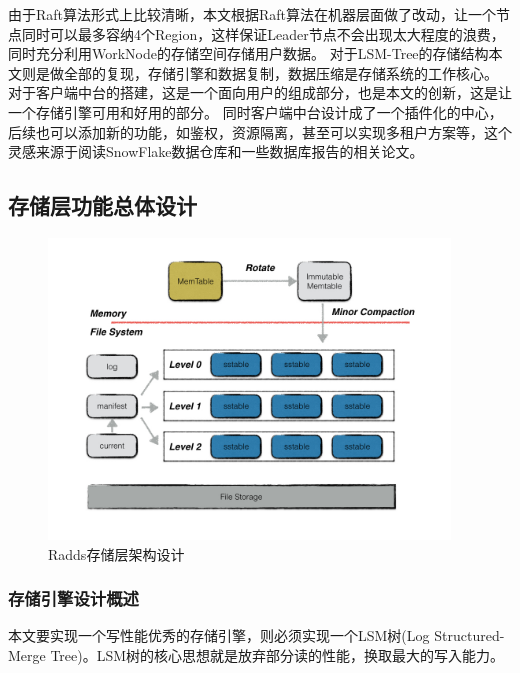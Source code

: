 \begin{enumerate}[fullwidth,itemindent=2em,listparindent=2em]
			由于Raft算法形式上比较清晰，本文根据Raft算法在机器层面做了改动，让一个节点同时可以最多容纳4个Region，这样保证Leader节点不会出现太大程度的浪费，
			同时充分利用WorkNode的存储空间存储用户数据。
			对于LSM-Tree的存储结构本文则是做全部的复现，存储引擎和数据复制，数据压缩是存储系统的工作核心。
			对于客户端中台的搭建，这是一个面向用户的组成部分，也是本文的创新，这是让一个存储引擎可用和好用的部分。
			同时客户端中台设计成了一个插件化的中心，后续也可以添加新的功能，如鉴权，资源隔离，甚至可以实现多租户方案等，这个灵感来源于阅读SnowFlake数据仓库和一些数据库报告的相关论文。
	
		\end{enumerate}
		

		  
	\subsection{存储层功能总体设计}
			
	\begin{figure}[H]
		\centering
		\includegraphics[width=0.95\textwidth]{images/radds_storage_arch.jpeg}
		\caption{Radds存储层架构设计}
		\label{mobile_overall_design}
	\end{figure}


		\subsubsection{存储引擎设计概述}
		
		本文要实现一个写性能优秀的存储引擎，则必须实现一个LSM树(Log Structured-Merge Tree)。LSM树的核心思想就是放弃部分读的性能，换取最大的写入能力。

